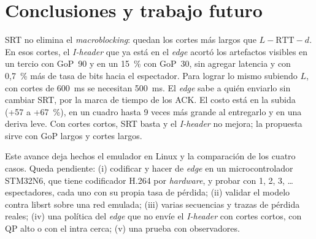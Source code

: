 \documentclass[10pt,twocolumn,letterpaper]{article}
\begin{document}
\section{Conclusiones y trabajo futuro}
\label{sec:conclusiones}
SRT no elimina el \emph{macroblocking}: quedan los cortes más largos que $L-\mathrm{RTT}-d$. En esos cortes, el \emph{I-header} que ya está en el \emph{edge} acortó los artefactos visibles en un tercio con GoP~90 y en un 15~\% con GoP~30, sin agregar latencia y con 0,7~\% más de tasa de bits hacia el espectador. Para lograr lo mismo subiendo $L$, con cortes de 600~ms se necesitan 500~ms. El \emph{edge} sabe a quién enviarlo sin cambiar SRT, por la marca de tiempo de los ACK. El costo está en la subida (+57 a +67~\%), en un cuadro hasta 9 veces más grande al entregarlo y en una deriva leve. Con cortes cortos, SRT basta y el \emph{I-header} no mejora; la propuesta sirve con GoP largos y cortes largos.

Este avance deja hechos el emulador en Linux y la comparación de los cuatro casos. Queda pendiente:
(i) codificar y hacer de \emph{edge} en un microcontrolador STM32N6, que tiene codificador H.264 por \emph{hardware}, y probar con 1, 2, 3, \ldots{} espectadores, cada uno con su propia tasa de pérdida;
(ii) validar el modelo contra libsrt sobre una red emulada;
(iii) varias secuencias y trazas de pérdida reales;
(iv) una política del \emph{edge} que no envíe el \emph{I-header} con cortes cortos, con QP alto o con el intra cerca;
(v) una prueba con observadores.
\end{document}
